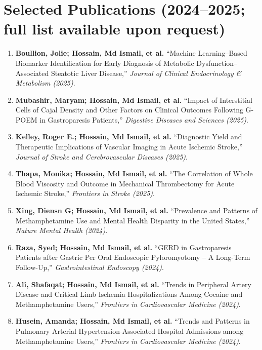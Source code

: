 \documentclass[letterpaper,10.9pt]{article}
\begin{document}
\section{Selected Publications \textnormal{\small (2024--2025; full list available upon request)}}

\begin{enumerate}
    \item \textbf{Boullion, Jolie; Hossain, Md Ismail, et al.}
    ``Machine Learning--Based Biomarker Identification for Early Diagnosis of Metabolic Dysfunction--Associated Steatotic Liver Disease,''
    \textit{Journal of Clinical Endocrinology \& Metabolism (2025)}.

    \item \textbf{Mubashir, Maryam; Hossain, Md Ismail, et al.}
    ``Impact of Interstitial Cells of Cajal Density and Other Factors on Clinical Outcomes Following G-POEM in Gastroparesis Patients,''
    \textit{Digestive Diseases and Sciences (2025)}.

    \item \textbf{Kelley, Roger E.; Hossain, Md Ismail, et al.}
    ``Diagnostic Yield and Therapeutic Implications of Vascular Imaging in Acute Ischemic Stroke,''
    \textit{Journal of Stroke and Cerebrovascular Diseases (2025)}.

    \item \textbf{Thapa, Monika; Hossain, Md Ismail, et al.}
    ``The Correlation of Whole Blood Viscosity and Outcome in Mechanical Thrombectomy for Acute Ischemic Stroke,''
    \textit{Frontiers in Stroke (2025)}.

    \item \textbf{Xing, Diensn G; Hossain, Md Ismail, et al.}
    ``Prevalence and Patterns of Methamphetamine Use and Mental Health Disparity in the United States,''
    \textit{Nature Mental Health (2024)}.

    \item \textbf{Raza, Syed; Hossain, Md Ismail, et al.}
    ``GERD in Gastroparesis Patients after Gastric Per Oral Endoscopic Pyloromyotomy -- A Long-Term Follow-Up,''
    \textit{Gastrointestinal Endoscopy (2024)}.

    \item \textbf{Ali, Shafaqat; Hossain, Md Ismail, et al.}
    ``Trends in Peripheral Artery Disease and Critical Limb Ischemia Hospitalizations Among Cocaine and Methamphetamine Users,''
    \textit{Frontiers in Cardiovascular Medicine (2024)}.

    \item \textbf{Husein, Amanda; Hossain, Md Ismail, et al.}
    ``Trends and Patterns in Pulmonary Arterial Hypertension-Associated Hospital Admissions among Methamphetamine Users,''
    \textit{Frontiers in Cardiovascular Medicine (2024)}.
\end{enumerate}
\end{document}
